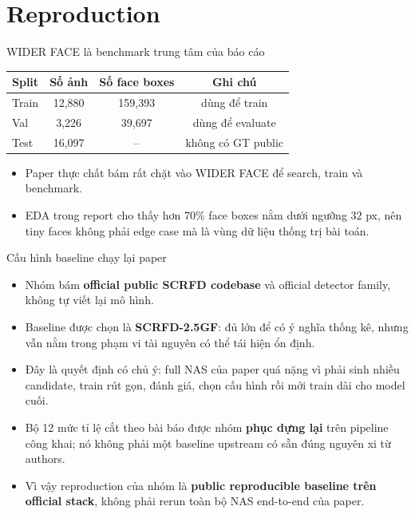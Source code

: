 \documentclass[aspectratio=169,11pt]{beamer}
\begin{document}
\section{Reproduction}

\begin{frame}{WIDER FACE là benchmark trung tâm của báo cáo}
  \small
  \begin{tabular}{@{}lccc@{}}
    \toprule
    Split & Số ảnh & Số face boxes & Ghi chú \\
    \midrule
    Train & 12,880 & 159,393 & dùng để train \\
    Val & 3,226 & 39,697 & dùng để evaluate \\
    Test & 16,097 & -- & không có GT public \\
    \bottomrule
  \end{tabular}

  \vspace{0.35cm}
  \begin{itemize}
    \item Paper thực chất bám rất chặt vào WIDER FACE để search, train và benchmark.
    \item EDA trong report cho thấy hơn 70\% face boxes nằm dưới ngưỡng \(32\) px, nên tiny faces không phải edge case mà là vùng dữ liệu thống trị bài toán.
  \end{itemize}
\end{frame}

\begin{frame}{Cấu hình baseline chạy lại paper}
  \begin{itemize}
    \item Nhóm bám \textbf{official public SCRFD codebase} và official detector family, không tự viết lại mô hình.
    \item Baseline được chọn là \textbf{SCRFD-2.5GF}: đủ lớn để có ý nghĩa thống kê, nhưng vẫn nằm trong phạm vi tài nguyên có thể tái hiện ổn định.
    \item Đây là quyết định có chủ ý: full NAS của paper quá nặng vì phải sinh nhiều candidate, train rút gọn, đánh giá, chọn cấu hình rồi mới train dài cho model cuối.
    \item Bộ 12 mức tỉ lệ cắt theo bài báo được nhóm \textbf{phục dựng lại} trên pipeline công khai; nó không phải một baseline upstream có sẵn đúng nguyên xi từ authors.
    \item Vì vậy reproduction của nhóm là \textbf{public reproducible baseline trên official stack}, không phải rerun toàn bộ NAS end-to-end của paper.
  \end{itemize}
\end{frame}
\end{document}

